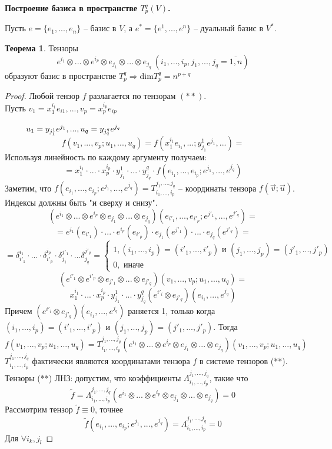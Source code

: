 \documentclass[a4paper, 12pt]{article}
\newcommand\tab[1][.5cm]{\hspace*{#1}}
\theoremstyle{definition}
\newtheorem*{theorem}{Теорема}
\begin{document}
    \begin{center}
        \textbf{Построение базиса в пространстве $T_p^q(V)$.}
    \end{center}
    Пусть $e = \{e_1,...,e_n\}$ -- базис в $V$, а $e^* = \{e^1,...,e^n\}$ -- дуальный базис в $V^*$.
    \begin{theorem}
        Тензоры 
        $$e^{i_1} \otimes ... \otimes e^{i_p} \otimes e_{j_1} \otimes ... \otimes e_{j_q}\ (i_1,...,i_p,j_1,...,j_q = \overline{1,n})$$ образуют базис в пространстве $T_p^q \Longrightarrow \text{dim}T_p^q = n^{p+q}$ 
    \end{theorem} 
    \begin{proof}
        Любой тензор $f$ разлагается по тензорам $(**)$.\\
        Пусть $v_1 = x_1^{i_1}e_{i1},..., v_p = x_p^{i_p}e_{ip}$

        $\tab[0.9cm]u_1 = y_{j_1^1}e^{j_1},..., u_q = y_{j_q^q}e^{j_q}$ 
        $$f(v_1,...,v_p;u_1,...,u_q) = f(x_1^{i_1}e_{i_1},...;y_{j_1}^1e^{j_1},...)= $$
        Используя линейность по каждому аргументу получаем:
        $$= x_1^{i_1}\cdot ... \cdot x_p^{i_p}\cdot y_{j_1}^1 \cdot ... \cdot y_{j_q}^q \cdot f(e_{i_1},...,e_{i_p};e^{j_1},...,e^{j_q})$$
        Заметим, что 
        $f(e_{i_1},...,e_{i_p};e^{j_1},...,e^{j_q}) = T_{i_1,...,i_p}^{j_1,...,j_q}$ -- координаты тензора $f(\vec v; \vec u)$.
        Индексы должны быть "и сверху и снизу".
        $$(e^{i_1} \otimes ... \otimes e^{i_p} \otimes e_{j_1} \otimes ... \otimes e_{j_q})(e_{i'_1},...,e_{i'_p};e^{j'_1},..., e^{j'_q}) =$$ 
        $$= e^{i_1}(e_{i'_1})\cdot ... \cdot e^{i_p}(e_{i'_p})\cdot e_{j_1}(e^{j'_1})\cdot ... \cdot e_{j_q}(e^{j'_q})= $$
        $$= \delta_{i'_1}^{i_1}\cdot ... \cdot \delta_{i'_p}^{i_p}\cdot \delta_{j_1}^{j'_1}\cdot ... \delta_{j_q}^{j'_q} = \begin{cases}
            1, (i_1,...,i_p) = (i'_1,...,i'_p) \text{ и } (j_1,...,j_p) = (j'_1,...,j'_p)\\
            0, \text{ иначе}
        \end{cases}$$
        $$(e^{i'_1} \otimes e^{i'_p} \otimes e_{j'_1} \otimes ... \otimes e_{j'_q})(v_1,...,v_p; u_1,...,u_q) = $$
        $$x_1^{i_1} \cdot ... \cdot x_p^{i_p}\cdot y_{j_1}^1 \cdot ... \cdot y_{j_q}^q(e^{i'_i}\otimes e_{j'_q})(e_{i_1},...,e^{j_q})$$
        Причем $(e^{i'_i}\otimes e_{j'_q})(e_{i_1},...,e^{j_q})$ раняется 1, только когда $(i_1,...,i_p) = (i'_1,...,i'_p)$ и $(j_1,...,j_p) = (j'_1,...,j'_p)$.
        Тогда 
        $$f(v_1,...,v_p;u_1,...,u_q) = T_{i_1,...,i_p}^{j_1,...,j_q}(e^{i_1}\otimes ... \otimes e^{i_p} \otimes e_{j_1} \otimes ... \otimes e_{j_q})(v_1,...,v_p;u_1,...,u_q)$$
        $T_{i_1,...,i_p}^{j_1,...,j_q}$ фактически являются координатами тензора $f$ в системе тензоров (**).\\
        Тензоры (**) ЛНЗ: допустим, что коэффициенты $\Lambda_{i_1,...,i_p}^{j_1,...,j_q}$, такие что
        $$\widetilde{f} = \Lambda_{i_1,...,i_p}^{j_1,...,j_q}(e^{i_1}\otimes ... \otimes e^{i_p} \otimes e_{j_1} \otimes ... \otimes e_{j_q}) = 0$$
        Рассмотрим тензор $\widetilde{f} \equiv 0$, точнее 
        $$\widetilde{f}(e_{i_1},...,e_{i_p};e^{j_1},...,e^{j_q}) = \Lambda_{i_1,...,i_p}^{j_1,...,j_q} = 0$$ 
        Для $\forall i_k,j_l$ 
    \end{proof}
\end{document}

